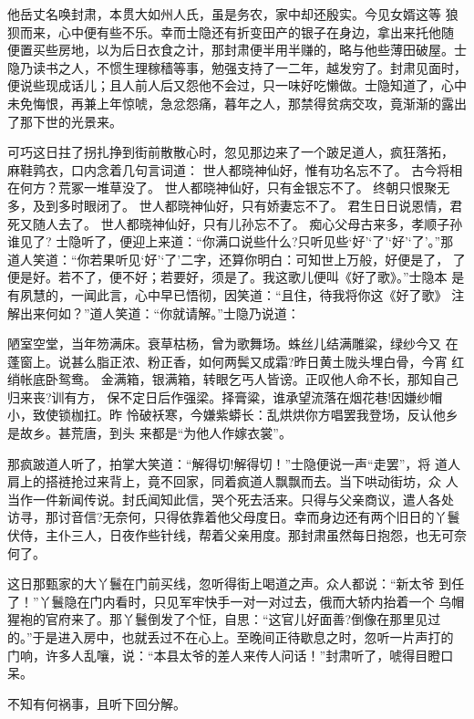 他岳丈名唤封肃，本贯大如州人氏，虽是务农，家中却还殷实。今见女婿这等
狼狈而来，心中便有些不乐。幸而士隐还有折变田产的银子在身边，拿出来托他随
便置买些房地，以为后日衣食之计，那封肃便半用半赚的，略与他些薄田破屋。士
隐乃读书之人，不惯生理稼穑等事，勉强支持了一二年，越发穷了。封肃见面时，
便说些现成话儿；且人前人后又怨他不会过，只一味好吃懒做。士隐知道了，心中
未免悔恨，再兼上年惊唬，急忿怨痛，暮年之人，那禁得贫病交攻，竟渐渐的露出
了那下世的光景来。

可巧这日拄了拐扎挣到街前散散心时，忽见那边来了一个跛足道人，疯狂落拓，
麻鞋鹑衣，口内念着几句言词道：
世人都晓神仙好，惟有功名忘不了。
古今将相在何方？荒冢一堆草没了。
世人都晓神仙好，只有金银忘不了。
终朝只恨聚无多，及到多时眼闭了。
世人都晓神仙好，只有娇妻忘不了。
君生日日说恩情，君死又随人去了。
世人都晓神仙好，只有儿孙忘不了。
痴心父母古来多，孝顺子孙谁见了?
士隐听了，便迎上来道：“你满口说些什么?只听见些‘好’‘了’‘好’‘了’。”那
道人笑道：“你若果听见‘好’‘了’二字，还算你明白：可知世上万般，好便是了，
了便是好。若不了，便不好；若要好，须是了。我这歌儿便叫《好了歌》。”士隐本
是有夙慧的，一闻此言，心中早已悟彻，因笑道：“且住，待我将你这《好了歌》
注解出来何如？”道人笑道：“你就请解。”士隐乃说道：

陋室空堂，当年笏满床。衰草枯杨，曾为歌舞场。蛛丝儿结满雕粱，绿纱今又
在蓬窗上。说甚么脂正浓、粉正香，如何两鬓又成霜?昨日黄土陇头埋白骨，今宵
红绡帐底卧鸳鸯。
金满箱，银满箱，转眼乞丐人皆谤。正叹他人命不长，那知自己归来丧?训有方，
保不定日后作强梁。择膏粱，谁承望流落在烟花巷!因嫌纱帽小，致使锁枷扛。昨
怜破袄寒，今嫌紫蟒长：乱烘烘你方唱罢我登场，反认他乡是故乡。甚荒唐，到头
来都是“为他人作嫁衣裳”。

那疯跛道人听了，拍掌大笑道：“解得切!解得切！”士隐便说一声“走罢”，将
道人肩上的搭裢抢过来背上，竟不回家，同着疯道人飘飘而去。当下哄动街坊，众
人当作一件新闻传说。封氏闻知此信，哭个死去活来。只得与父亲商议，遣人各处
访寻，那讨音信?无奈何，只得依靠着他父母度日。幸而身边还有两个旧日的丫鬟
伏侍，主仆三人，日夜作些针线，帮着父亲用度。那封肃虽然每日抱怨，也无可奈
何了。

这日那甄家的大丫鬟在门前买线，忽听得街上喝道之声。众人都说：“新太爷
到任了！”丫鬟隐在门内看时，只见军牢快手一对一对过去，俄而大轿内抬着一个
乌帽猩袍的官府来了。那丫鬟倒发了个怔，自思：“这官儿好面善?倒像在那里见过
的。”于是进入房中，也就丢过不在心上。至晚间正待歇息之时，忽听一片声打的
门响，许多人乱嚷，说：“本县太爷的差人来传人问话！”封肃听了，唬得目瞪口呆。

不知有何祸事，且听下回分解。